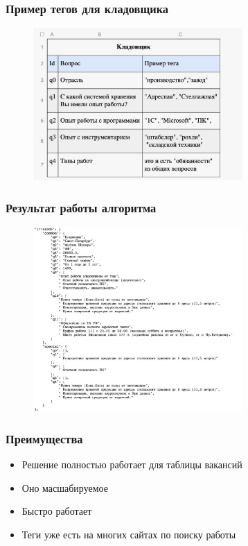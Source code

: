 \documentclass[xcolor=table,xetex,mathserif,serif]{beamer}
\begin{document}
\begin{frame}
	\frametitle{Пример тегов для кладовщика}

	\begin{figure}[t]
		\includegraphics[width=8cm]{"./images/sample.jpg"}
		\centering
	\end{figure}
\end{frame}


\begin{frame}
	\frametitle{Результат работы алгоритма}

	\begin{figure}[t]
		\includegraphics[width=8cm]{"./images/result.jpg"}
		\centering
	\end{figure}
\end{frame}


\begin{frame}
	\frametitle{Преимущества}

	\begin{itemize}
		\item Решение полностью работает для таблицы вакансий
		\item Оно масшабируемое
		\item Быстро работает
		\item Теги уже есть на многих сайтах по поиску работы
	\end{itemize}
\end{frame}
\end{document}
